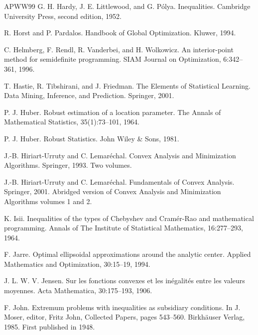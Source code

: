\begin{thebibliography}{APWW99}
 G. H. Hardy, J. E. Littlewood, and G. Pólya. Inequalities. Cambridge University Press, second edition, 1952.

 R. Horst and P. Pardalos. Handbook of Global Optimization. Kluwer, 1994.

 C. Helmberg, F. Rendl, R. Vanderbei, and H. Wolkowicz. An interior-point method for semidefinite programming. SIAM Journal on Optimization, 6:342–361, 1996.

 T. Hastie, R. Tibshirani, and J. Friedman. The Elements of Statistical Learning. Data Mining, Inference, and Prediction. Springer, 2001.

 P. J. Huber. Robust estimation of a location parameter. The Annals of Mathematical Statistics, 35(1):73–101, 1964.

 P. J. Huber. Robust Statistics. John Wiley \& Sons, 1981.

 J.-B. Hiriart-Urruty and C. Lemaréchal. Convex Analysis and Minimization Algorithms. Springer, 1993. Two volumes.

 J.-B. Hiriart-Urruty and C. Lemaréchal. Fundamentals of Convex Analysis. Springer, 2001. Abridged version of Convex Analysis and Minimization Algorithms volumes 1 and 2.

 K. Isii. Inequalities of the types of Chebyshev and Cramér-Rao and mathematical programming. Annals of The Institute of Statistical Mathematics, 16:277–293, 1964.

 F. Jarre. Optimal ellipsoidal approximations around the analytic center. Applied Mathematics and Optimization, 30:15–19, 1994.

 J. L. W. V. Jensen. Sur les fonctions convexes et les inégalités entre les valeurs moyennes. Acta Mathematica, 30:175–193, 1906.

 F. John. Extremum problems with inequalities as subsidiary conditions. In J. Moser, editor, Fritz John, Collected Papers, pages 543–560. Birkhäuser Verlag, 1985. First published in 1948.


\end{thebibliography}
